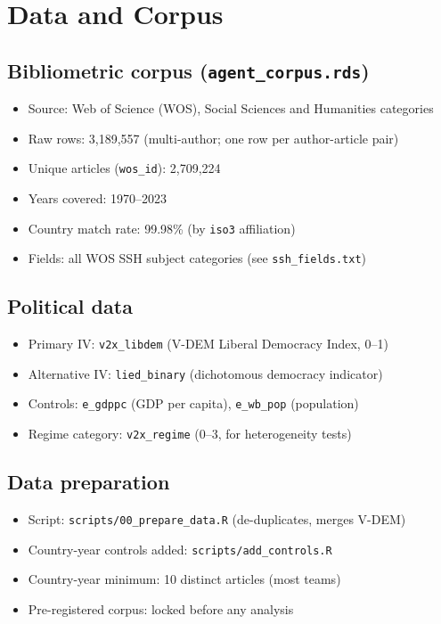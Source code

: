 \documentclass[12pt,a4paper]{article}
\begin{document}
\section{Data and Corpus}
\label{sec:data}

\subsection{Bibliometric corpus (\texttt{agent\_corpus.rds})}

\begin{itemize}
  \item Source: Web of Science (WOS), Social Sciences and Humanities categories
  \item Raw rows: 3,189,557 (multi-author; one row per author-article pair)
  \item Unique articles (\texttt{wos\_id}): 2,709,224
  \item Years covered: 1970--2023
  \item Country match rate: 99.98\% (by \texttt{iso3} affiliation)
  \item Fields: all WOS SSH subject categories (see \texttt{ssh\_fields.txt})
\end{itemize}

\subsection{Political data}

\begin{itemize}
  \item Primary IV: \texttt{v2x\_libdem} (V-DEM Liberal Democracy Index, 0--1)
  \item Alternative IV: \texttt{lied\_binary} (dichotomous democracy indicator)
  \item Controls: \texttt{e\_gdppc} (GDP per capita), \texttt{e\_wb\_pop} (population)
  \item Regime category: \texttt{v2x\_regime} (0--3, for heterogeneity tests)
\end{itemize}

\subsection{Data preparation}

\begin{itemize}
  \item Script: \texttt{scripts/00\_prepare\_data.R} (de-duplicates, merges V-DEM)
  \item Country-year controls added: \texttt{scripts/add\_controls.R}
  \item Country-year minimum: 10 distinct articles (most teams)
  \item Pre-registered corpus: locked before any analysis
\end{itemize}
\end{document}
